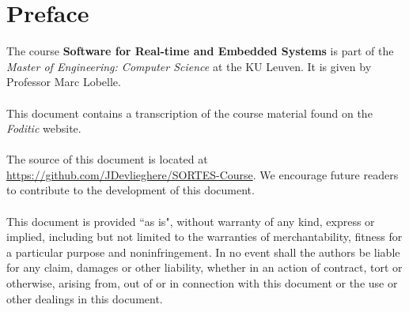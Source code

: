 \documentclass[main.tex]{subfiles}
\begin{document}
\chapter*{Preface}
The course \textbf{Software for Real-time and Embedded Systems} is part of the \textit{Master of Engineering: Computer Science} at the KU Leuven. It is given by Professor Marc Lobelle.
\\\\
This document contains a transcription of the course material found on the \textit{Foditic} website.
\\\\
The source of this document is located at \url{https://github.com/JDevlieghere/SORTES-Course}. We encourage future readers to contribute to the development of this document.
\\\\
This document is provided ``as is", without warranty of any kind, express or implied, including but not limited to the warranties of merchantability, fitness for a particular purpose and noninfringement.
In no event shall the authors be liable for any claim, damages or other liability, whether in an action of contract, tort or otherwise, arising from, out of or in connection with this document or the use or other dealings in this document.
\end{document}
